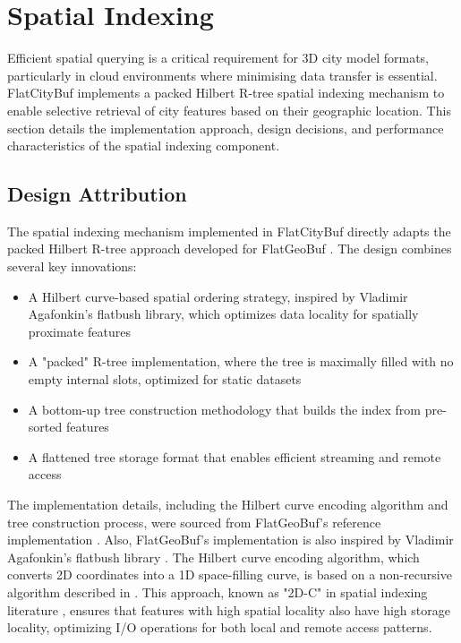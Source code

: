 
\section{Spatial Indexing}
\label{methodology:spatial_index}

Efficient spatial querying is a critical requirement for 3D city model formats, particularly in cloud environments where minimising data transfer is essential. FlatCityBuf implements a packed Hilbert R-tree spatial indexing mechanism \citep{Roussopoulos_Leifker_1985} to enable selective retrieval of city features based on their geographic location. This section details the implementation approach, design decisions, and performance characteristics of the spatial indexing component.

\subsection{Design Attribution}
\label{methodology:spatial_index:attribution}

The spatial indexing mechanism implemented in FlatCityBuf directly adapts the packed Hilbert R-tree approach developed for FlatGeoBuf \citep{horance_2022_detail}. The design combines several key innovations:

\begin{itemize}
  \item A Hilbert curve-based spatial ordering strategy, inspired by Vladimir Agafonkin's flatbush library, which optimizes data locality for spatially proximate features
  \item A "packed" R-tree implementation, where the tree is maximally filled with no empty internal slots, optimized for static datasets
  \item A bottom-up tree construction methodology that builds the index from pre-sorted features
  \item A flattened tree storage format that enables efficient streaming and remote access
\end{itemize}

The implementation details, including the Hilbert curve encoding algorithm and tree construction process, were sourced from FlatGeoBuf's reference implementation \citep{flatgeobuf_github}. Also, FlatGeoBuf's implementation is also inspired by Vladimir Agafonkin's flatbush library \citep{vladimir_2018}. The Hilbert curve encoding algorithm, which converts 2D coordinates into a 1D space-filling curve, is based on a non-recursive algorithm described in \citet{hacker_delight_2012}. This approach, known as "2D-C" in spatial indexing literature \citep{hacker_delight_2012}, ensures that features with high spatial locality also have high storage locality, optimizing I/O operations for both local and remote access patterns.

